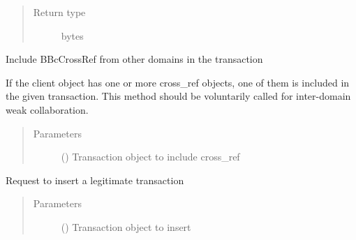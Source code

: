 \documentclass[letterpaper,10pt,english]{sphinxmanual}
\begin{document}
\begin{fulllineitems}
\begin{fulllineitems}
\begin{quote}
\begin{description}
\item[{Return type}] \leavevmode
bytes

\end{description}\end{quote}

\end{fulllineitems}


\begin{fulllineitems}
\label{\detokenize{bbc1.core.bbc_app:bbc1.core.bbc_app.BBcAppClient.include_admin_info}}
\end{fulllineitems}


\begin{fulllineitems}
\label{\detokenize{bbc1.core.bbc_app:bbc1.core.bbc_app.BBcAppClient.include_cross_ref}}
Include BBcCrossRef from other domains in the transaction

If the client object has one or more cross\_ref objects, one of them is included in the given transaction.
This method should be voluntarily called for inter-domain weak collaboration.
\begin{quote}\begin{description}
\item[{Parameters}] \leavevmode
{} ({\hyperref[\detokenize{bbc1.core.bbclib:bbc1.core.bbclib.BBcTransaction}]{}}) \textendash{} Transaction object to include cross\_ref

\end{description}\end{quote}

\end{fulllineitems}


\begin{fulllineitems}
\label{\detokenize{bbc1.core.bbc_app:bbc1.core.bbc_app.BBcAppClient.insert_transaction}}
Request to insert a legitimate transaction
\begin{quote}\begin{description}
\item[{Parameters}] \leavevmode
{} ({\hyperref[\detokenize{bbc1.core.bbclib:bbc1.core.bbclib.BBcTransaction}]{}}) \textendash{} Transaction object to insert


\end{description}
\end{quote}
\end{fulllineitems}
\end{fulllineitems}
\end{document}
